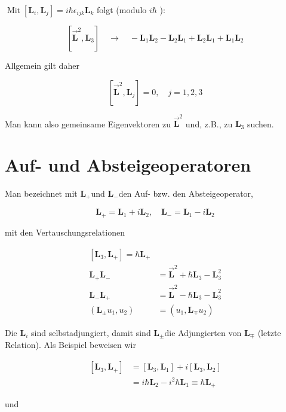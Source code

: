 \documentclass[10pt, letterpaper]{article}
\begin{document}
$\operatorname{Mit}\left[\mathbf{L}_{i}, \mathbf{L}_{j}\right]=i \hbar \epsilon_{i j k} \mathbf{L}_{k}$ folgt (modulo $i \hbar$ ):

$$
\left[\overrightarrow{\mathbf{L}}^{2}, \mathbf{L}_{3}\right] \quad \rightarrow \quad-\mathbf{L}_{1} \mathbf{L}_{2}-\mathbf{L}_{2} \mathbf{L}_{1}+\mathbf{L}_{2} \mathbf{L}_{1}+\mathbf{L}_{1} \mathbf{L}_{2}
$$

Allgemein gilt daher

$$
\left[\overrightarrow{\mathbf{L}}^{2}, \mathbf{L}_{j}\right]=0, \quad j=1,2,3
$$

Man kann also gemeinsame Eigenvektoren zu $\overrightarrow{\mathbf{L}}^{2}$ und, z.B., zu $\mathbf{L}_{3}$ suchen.

\section*{Auf- und Absteigeoperatoren}
Man bezeichnet mit $\mathbf{L}_{+}$und $\mathbf{L}_{-}$den Auf- bzw. den Absteigeoperator,

$$
\mathbf{L}_{+}=\mathbf{L}_{1}+i \mathbf{L}_{2}, \quad \mathbf{L}_{-}=\mathbf{L}_{1}-i \mathbf{L}_{2}
$$

mit den Vertauschungsrelationen

$$
\begin{aligned}
{\left[\mathbf{L}_{3}, \mathbf{L}_{+}\right]=\hbar \mathbf{L}_{+} } & \\
\mathbf{L}_{+} \mathbf{L}_{-} & =\overrightarrow{\mathbf{L}}^{2}+\hbar \mathbf{L}_{3}-\mathbf{L}_{3}^{2} \\
\mathbf{L}_{-} \mathbf{L}_{+} & =\overrightarrow{\mathbf{L}}^{2}-\hbar \mathbf{L}_{3}-\mathbf{L}_{3}^{2} \\
\left(\mathbf{L}_{ \pm} u_{1}, u_{2}\right) & =\left(u_{1}, \mathbf{L}_{\mp} u_{2}\right)
\end{aligned}
$$

Die $\mathbf{L}_{i}$ sind selbstadjungiert, damit sind $\mathbf{L}_{ \pm}$die Adjungierten von $\mathbf{L}_{\mp}$ (letzte Relation). Als Beispiel beweisen wir

$$
\begin{aligned}
{\left[\mathbf{L}_{3}, \mathbf{L}_{+}\right] } & =\left[\mathbf{L}_{3}, \mathbf{L}_{1}\right]+i\left[\mathbf{L}_{3}, \mathbf{L}_{2}\right] \\
& =i \hbar \mathbf{L}_{2}-i^{2} \hbar \mathbf{L}_{1} \equiv \hbar \mathbf{L}_{+}
\end{aligned}
$$

und
\end{document}
